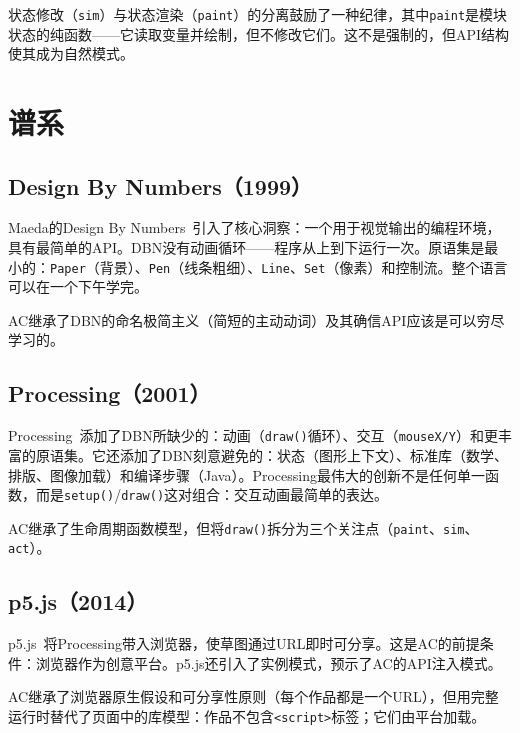 \documentclass[10pt,letterpaper,twocolumn]{article}
\begin{document}
状态修改（\texttt{sim}）与状态渲染（\texttt{paint}）的分离鼓励了一种纪律，其中\texttt{paint}是模块状态的纯函数——它读取变量并绘制，但不修改它们。这不是强制的，但API结构使其成为自然模式。


\section{谱系}
\label{sec:genealogy}

\subsection{Design By Numbers（1999）}

Maeda的Design By Numbers~\citep{maeda2001dbn}引入了核心洞察：一个用于视觉输出的编程环境，具有最简单的API。DBN没有动画循环——程序从上到下运行一次。原语集是最小的：\texttt{Paper}（背景）、\texttt{Pen}（线条粗细）、\texttt{Line}、\texttt{Set}（像素）和控制流。整个语言可以在一个下午学完。

AC继承了DBN的命名极简主义（简短的主动动词）及其确信API应该是可以穷尽学习的。

\subsection{Processing（2001）}

Processing~\citep{reas2003processing}添加了DBN所缺少的：动画（\texttt{draw()}循环）、交互（\texttt{mouseX/Y}）和更丰富的原语集。它还添加了DBN刻意避免的：状态（图形上下文）、标准库（数学、排版、图像加载）和编译步骤（Java）。Processing最伟大的创新不是任何单一函数，而是\texttt{setup()}/\texttt{draw()}这对组合：交互动画最简单的表达。

AC继承了生命周期函数模型，但将\texttt{draw()}拆分为三个关注点（\texttt{paint}、\texttt{sim}、\texttt{act}）。

\subsection{p5.js（2014）}

p5.js~\citep{mccarthy2015p5js}将Processing带入浏览器，使草图通过URL即时可分享。这是AC的前提条件：浏览器作为创意平台。p5.js还引入了实例模式，预示了AC的API注入模式。

AC继承了浏览器原生假设和可分享性原则（每个作品都是一个URL），但用完整运行时替代了页面中的库模型：作品不包含\texttt{<script>}标签；它们由平台加载。
\end{document}
